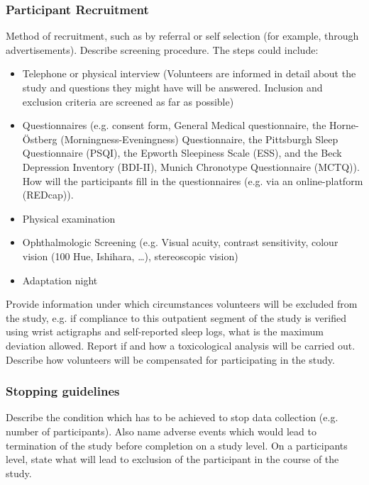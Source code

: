 \subsubsection{Participant Recruitment}
\begin{prereg}
\begin{instruction}
Method of recruitment, such as by referral or self selection (for example, through advertisements). Describe screening procedure. The steps could include: 
\begin{itemize}
    \item Telephone or physical interview (Volunteers are informed in detail about the study and questions they might have will be answered. Inclusion and exclusion criteria are screened as far as possible) 
    \item Questionnaires (e.g. consent form, General Medical questionnaire, the Horne-Östberg (Morningness-Eveningness) Questionnaire, the Pittsburgh Sleep Questionnaire (PSQI), the Epworth Sleepiness Scale (ESS), and the Beck Depression Inventory (BDI-II), Munich Chronotype Questionnaire (MCTQ)). How will the participants fill in the questionnaires (e.g. via an online-platform (REDcap)). 
    \item Physical examination
    \item Ophthalmologic Screening (e.g. Visual acuity, contrast sensitivity, colour vision (100 Hue, Ishihara, …), stereoscopic vision)
\item Adaptation night 
\end{itemize}
Provide information under which circumstances volunteers will be excluded from the study, e.g. if compliance to this outpatient segment of the study is verified using wrist actigraphs and self-reported sleep logs, what is the maximum deviation allowed. Report if and how a toxicological analysis will be carried out. Describe how volunteers will be compensated for participating in the study.
\end{instruction}
\end{prereg}


\subsubsection{Stopping guidelines}
\begin{prereg}
\begin{instruction}
Describe the condition which has to be achieved to stop data collection (e.g. number of participants). Also name adverse events which would lead to termination of the study before completion on a study level. On a participants level, state what will lead to exclusion of the participant in the course of the study.
\end{instruction}
\end{prereg}

